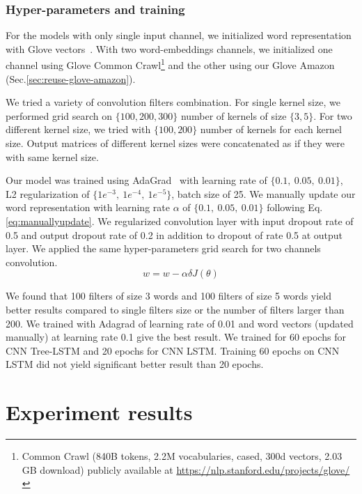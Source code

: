 \subsubsection{Hyper-parameters and training}
For the models with only single input channel, we initialized word representation with Glove vectors~\cite{glove}.
With two word-embeddings channels, we initialized one channel using Glove Common Crawl\footnote{\label{glovecommoncrawl}Common Crawl (840B tokens, 2.2M vocabularies, cased, 300d vectors, 2.03 GB download) publicly available at \url{https://nlp.stanford.edu/projects/glove/}} and the other using our Glove Amazon (Sec.\ref{sec:reuse-glove-amazon}).

We tried a variety of convolution filters combination.
For single kernel size, we performed grid search on $\{100, 200, 300\}$ number of kernels of size $\{3, 5\}$.
For two different kernel size, we tried with $\{100, 200\}$ number of kernels for each kernel size.
Output matrices of different kernel sizes were concatenated as if they were with same kernel size.

Our model was trained using AdaGrad~\cite{duchi2011adaptive} with learning rate of $\{0.1,~ 0.05,~ 0.01\}$, L2 regularization of $\{1e^{-3},~ 1e^{-4}, ~ 1e^{-5} \}$, batch size of 25.
We manually update our word representation with learning rate $\alpha$ of $\{0.1,~0.05, ~0.01\}$ following Eq.\ref{eq:manuallyupdate}.
We regularized convolution layer with input dropout rate of 0.5 and output dropout rate of 0.2 in addition to dropout of rate 0.5 at output layer.
We applied the same hyper-parameters grid search for two channels convolution.
\begin{equation}
\label{eq:manuallyupdate}
w = w - \alpha\delta J(\theta)
\end{equation}

We found that 100 filters of size 3 words and 100 filters of size 5 words yield better results compared to single filters size or the number of filters larger than 200. We trained with Adagrad of learning rate of 0.01 and word vectors (updated manually) at learning rate 0.1 give the best result. We trained for 60 epochs for CNN Tree-LSTM and 20 epochs for CNN LSTM. Training 60 epochs on CNN LSTM did not yield significant better result than 20 epochs.

\section{Experiment results}

